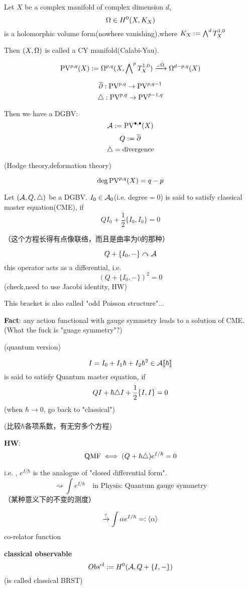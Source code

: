 \begin{example}
Let $X$ be a complex manifold of complex dimension $d$,
$$\Omega\in H^0(X,K_X)$$
is a holomorphic volume form(nowhere vanishing),where
$K_X:=\bigwedge\nolimits^{d}T_X^{1,0}$

Then $(X,\Omega)$ is called a CY manifold(Calabi-Yau).

$$\operatorname{PV}^{p,q}(X):=\Omega^{p,q}(X,\bigwedge\nolimits^{p}T_X^{1,0})
\xrightarrow{\lrcorner\,\Omega}\Omega^{d-p,q}(X)$$

$$\overline{\partial}:\operatorname{PV}^{p,q}\to\operatorname{PV}^{p,q-1}$$
$$\triangle:\operatorname{PV}^{p,q}\to\operatorname{PV}^{p-1,q}$$
\end{example}
Then we have a DGBV:
$$\mathcal{A}:=\operatorname{PV}^{\bullet,\bullet}(X)$$
$$Q:=\overline{\partial}$$
$$\triangle=\text{divergence}$$

(Hodge theory,deformation theory)

$$\deg\operatorname{PV}^{p,q}(X)=q-p$$

\begin{definition}
Let $(\mathcal{A},Q,\triangle)$ be a DGBV. $I_0\in\mathcal{A}_0$(i.e. degree$=0$) is said to
satisfy classical master equation(CME), if
$$QI_0+\frac{1}{2}\{I_0,I_0\}=0$$
\end{definition}
（这个方程长得有点像联络，而且是曲率为0的那种）

$$Q+\{I_0,-\}\curvearrowright\mathcal{A}$$
this operator acts as a differential, i.e.
$$(Q+\{I_0,-\})^2=0$$
(check,need to use Jacobi identity, HW)

This bracket is also called "odd Poisson structure"...

\textbf{Fact}:
any action functional with gauge symmetry leads to a solution of CME.
(What the fuck is "guage symmetry"?)

(quantum version)

$$I=I_0+I_1\hbar+I_2\hbar^2\in\mathcal{A}[\![\hbar]\!]$$
is said to satisfy Quantum master equation, if
$$QI+\hbar\triangle I+\frac{1}{2}\{I,I\}=0$$
(when $\hbar\to 0$, go back to "classical")

(比较$\hbar$各项系数，有无穷多个方程)

\textbf{HW}:
$$\text{QMF}\iff (Q+\hbar\triangle)e^{I/\hbar}=0$$

i.e. , $e^{I/\hbar}$ is the analogue of "closed differential form".
$$\rightsquigarrow\int e^{I/\hbar}\quad
\text{in Physis: Quantum gauge symmetry}$$
（某种意义下的不变的测度）

$$\xrightarrow{?}\int \alpha e^{I/\hbar}=:\langle\alpha\rangle$$
co-relator function

\textbf{classical observable}
$$Obs^{cl}:=H^0(\mathcal{A},Q+\{I,-\})$$
(is called classical BRST)

